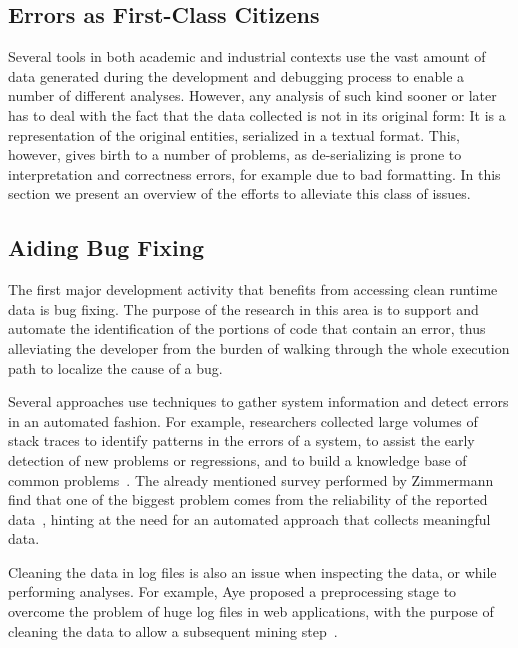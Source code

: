 \subsection{Errors as First-Class Citizens} \label{sec:related-reified}

Several tools in both academic and industrial contexts use the vast amount of data generated during the development and debugging process to enable a number of different analyses.
However, any analysis of such kind sooner or later has to deal with the fact that the data collected is not in its original form: It is a representation of the original entities, serialized in a textual format.
This, however, gives birth to a number of problems, as de-serializing is prone to interpretation and correctness errors, for example due to bad formatting.
In this section we present an overview of the efforts to alleviate this class of issues.


\subsection{Aiding Bug Fixing}

The first major development activity that benefits from accessing clean runtime data is bug fixing.
The purpose of the research in this area is to support and automate the identification of the portions of code that contain an error, thus alleviating the developer from the burden of walking through the whole execution path to localize the cause of a bug.

Several approaches use techniques to gather system information and detect errors in an automated fashion.
For example, researchers collected large volumes of stack traces to identify patterns in the errors of a system, to assist the early detection of new problems or regressions, and to build a knowledge base of common problems~\cite{Han2012,Arno2007}. %
The already mentioned survey performed by Zimmermann \etal find that one of the biggest problem comes from the reliability of the reported data~\cite{Zimm2010a}, hinting at the need for an automated approach that collects meaningful data.

Cleaning the data in log files is also an issue when inspecting the data, or while performing analyses.
For example, Aye proposed a preprocessing stage to overcome the problem of huge log files in web applications, with the purpose of cleaning the data to allow a subsequent mining step~\cite{Aye2011}.


